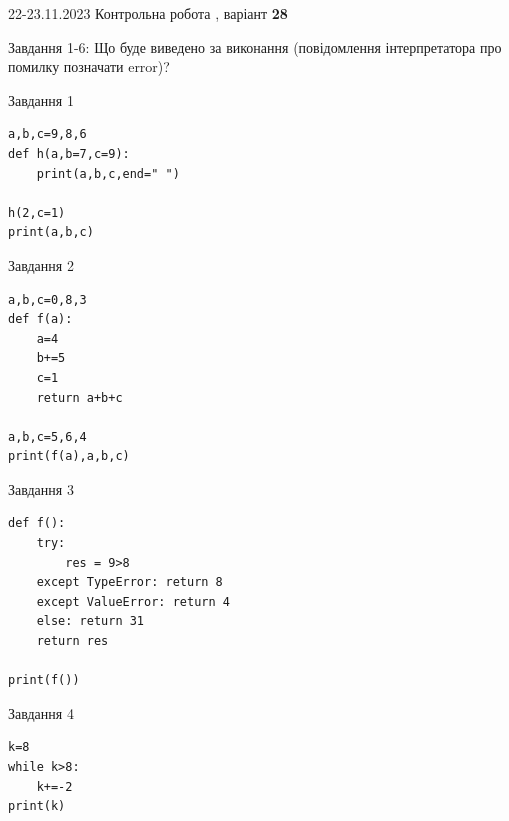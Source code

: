 \documentclass[12pt, ukrainian]{article}
\begin{document}
{{22-23.11.2023 Контрольна робота , варіант  \No \textbf { 28 }\par}}
{

Завдання 1-6: Що буде виведено за виконання (повідомлення інтерпретатора про помилку позначати error)?


\begin{minipage}[t]{9.7cm}                
{\begin{center}Завдання {1}\end{center}}
\begin{verbatim}
a,b,c=9,8,6
def h(a,b=7,c=9):
    print(a,b,c,end=" ")

h(2,c=1)
print(a,b,c)
\end{verbatim}     
\end{minipage}
\vline \hspace{8mm}
\begin{minipage}[t]{8.0cm}                
{\begin{center}Завдання {2}\end{center}}
\begin{verbatim}
a,b,c=0,8,3
def f(a):
    a=4
    b+=5
    c=1
    return a+b+c

a,b,c=5,6,4
print(f(a),a,b,c)
\end{verbatim}     
\end{minipage}

\vspace{15mm}
\begin{minipage}[t]{9.7cm}                
{\begin{center}Завдання {3}\end{center}}
\begin{verbatim}
def f():
    try:
        res = 9>8
    except TypeError: return 8
    except ValueError: return 4
    else: return 31
    return res

print(f())
\end{verbatim}     
\end{minipage}
\vline \hspace{8mm}
\begin{minipage}[t]{8.0cm}                
{\begin{center}Завдання {4}\end{center}}
\begin{verbatim}
k=8
while k>8:
    k+=-2
print(k)
\end{verbatim}     
\end{minipage}

}
\end{document}

